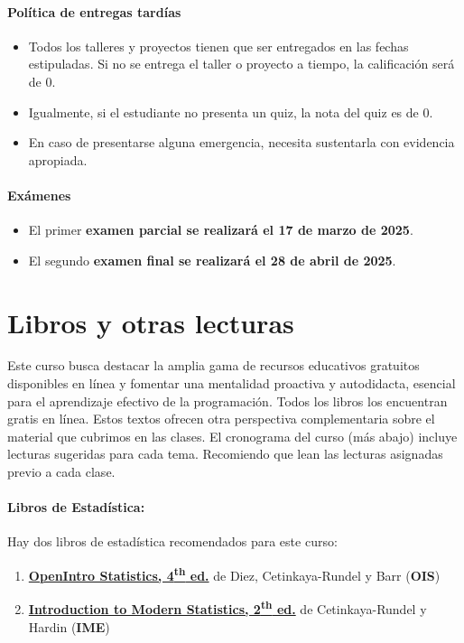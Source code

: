 \documentclass[10pt]{article}
\begin{document}
	\paragraph{Política de entregas tardías}
	\begin{itemize}
\item Todos los talleres y proyectos tienen que ser entregados en las fechas estipuladas. Si no se entrega el taller o proyecto a tiempo, la calificación será de 0.  

\item Igualmente, si el estudiante no presenta un quiz, la nota del quiz es de 0. 

\item En caso de presentarse alguna emergencia, necesita sustentarla con evidencia apropiada.
	\end{itemize}
	
	\paragraph{Exámenes}
	\begin{itemize}
		\item El primer \textbf{examen parcial se realizará el 17 de marzo de 2025}.
		\item El segundo \textbf{examen final se realizará el 28 de abril de 2025}.
	\end{itemize}
	
	
	\section*{Libros y otras lecturas}
	
	Este curso busca destacar la amplia gama de recursos educativos gratuitos disponibles en línea y fomentar una mentalidad proactiva y autodidacta, esencial para el aprendizaje efectivo de la programación. Todos los libros los encuentran gratis en línea. Estos textos ofrecen otra perspectiva complementaria sobre el material que cubrimos en las clases. El cronograma del curso (más abajo) incluye lecturas sugeridas para cada tema. Recomiendo que lean las lecturas asignadas previo a cada clase.
	
	\paragraph{Libros de Estadística:} Hay dos libros de estadística recomendados para este curso:
	
	\begin{enumerate}
		\item \href{https://www.openintro.org/book/os/}{\textbf{OpenIntro Statistics, 4\textsuperscript{th} ed.}} de Diez, Cetinkaya-Rundel y Barr (\textbf{OIS})
		\item \href{https://openintro-ims.netlify.app/}{\textbf{Introduction to Modern Statistics, 2\textsuperscript{th} ed.}} de Cetinkaya-Rundel y Hardin (\textbf{IME})
	\end{enumerate}
	
\end{document}

